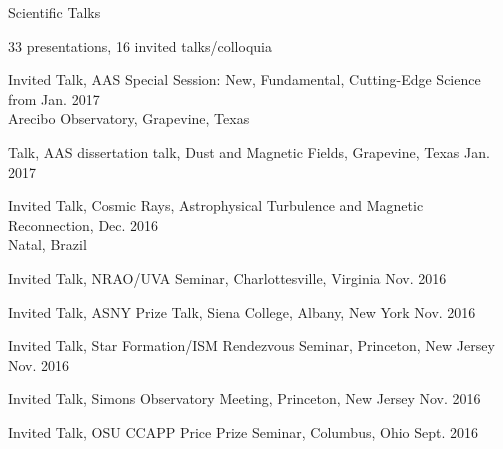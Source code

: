 \documentclass{resume_clark} %
\begin{document}
\begin{rSection}{Scientific Talks}

33 presentations, 16 invited talks/colloquia 

\begin{etaremune}[itemsep=-1.8mm]




\item Invited Talk, AAS Special Session: New, Fundamental, Cutting-Edge Science from \hfill{Jan. 2017} \\ Arecibo Observatory, Grapevine, Texas

\item Talk, AAS dissertation talk, Dust and Magnetic Fields, Grapevine, Texas \hfill{Jan. 2017}

\item Invited Talk, Cosmic Rays, Astrophysical Turbulence and Magnetic Reconnection, \hfill{Dec. 2016}\\
Natal, Brazil 

\item Invited Talk, NRAO/UVA Seminar, Charlottesville, Virginia \hfill{Nov. 2016}

\item Invited Talk, ASNY Prize Talk, Siena College, Albany, New York \hfill{Nov. 2016}

\item Invited Talk, Star Formation/ISM Rendezvous Seminar, Princeton, New Jersey \hfill{Nov. 2016}

\item Invited Talk, Simons Observatory Meeting, Princeton, New Jersey \hfill{Nov. 2016}

\item Invited Talk, OSU CCAPP Price Prize Seminar, Columbus, Ohio \hfill{Sept. 2016}


\end{etaremune}
\end{rSection}
\end{document}
